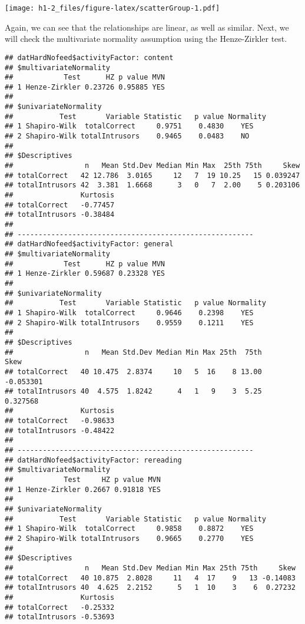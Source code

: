 \documentclass[12pt,]{article}
\newenvironment{Shaded}{\begin{snugshade}}{\end{snugshade}}
\newcommand{\DataTypeTok}[1]{\textcolor[rgb]{0.13,0.29,0.53}{#1}}
\newcommand{\KeywordTok}[1]{\textcolor[rgb]{0.13,0.29,0.53}{\textbf{#1}}}
\newcommand{\NormalTok}[1]{#1}
\newcommand{\OperatorTok}[1]{\textcolor[rgb]{0.81,0.36,0.00}{\textbf{#1}}}
\newcommand{\StringTok}[1]{\textcolor[rgb]{0.31,0.60,0.02}{#1}}
\begin{document}
\texttt{[image: h1-2\_files/figure-latex/scatterGroup-1.pdf]}

Again, we can see that the relationships are linear, as well as similar.
Next, we will check the multivariate normality assumption using the
Henze-Zirkler test.

\begin{Shaded}
\end{Shaded}

\begin{verbatim}
## datHardNofeed$activityFactor: content
## $multivariateNormality
##            Test      HZ p value MVN
## 1 Henze-Zirkler 0.23726 0.95885 YES
## 
## $univariateNormality
##           Test       Variable Statistic   p value Normality
## 1 Shapiro-Wilk  totalCorrect     0.9751    0.4830    YES   
## 2 Shapiro-Wilk totalIntrusors    0.9465    0.0483    NO    
## 
## $Descriptives
##                 n   Mean Std.Dev Median Min Max  25th 75th     Skew
## totalCorrect   42 12.786  3.0165     12   7  19 10.25   15 0.039247
## totalIntrusors 42  3.381  1.6668      3   0   7  2.00    5 0.203106
##                Kurtosis
## totalCorrect   -0.77457
## totalIntrusors -0.38484
## 
## -------------------------------------------------------- 
## datHardNofeed$activityFactor: general
## $multivariateNormality
##            Test      HZ p value MVN
## 1 Henze-Zirkler 0.59687 0.23328 YES
## 
## $univariateNormality
##           Test       Variable Statistic   p value Normality
## 1 Shapiro-Wilk  totalCorrect     0.9646    0.2398    YES   
## 2 Shapiro-Wilk totalIntrusors    0.9559    0.1211    YES   
## 
## $Descriptives
##                 n   Mean Std.Dev Median Min Max 25th  75th      Skew
## totalCorrect   40 10.475  2.8374     10   5  16    8 13.00 -0.053301
## totalIntrusors 40  4.575  1.8242      4   1   9    3  5.25  0.327568
##                Kurtosis
## totalCorrect   -0.98633
## totalIntrusors -0.48422
## 
## -------------------------------------------------------- 
## datHardNofeed$activityFactor: rereading
## $multivariateNormality
##            Test     HZ p value MVN
## 1 Henze-Zirkler 0.2667 0.91818 YES
## 
## $univariateNormality
##           Test       Variable Statistic   p value Normality
## 1 Shapiro-Wilk  totalCorrect     0.9858    0.8872    YES   
## 2 Shapiro-Wilk totalIntrusors    0.9665    0.2770    YES   
## 
## $Descriptives
##                 n   Mean Std.Dev Median Min Max 25th 75th     Skew
## totalCorrect   40 10.875  2.8028     11   4  17    9   13 -0.14083
## totalIntrusors 40  4.625  2.2152      5   1  10    3    6  0.27232
##                Kurtosis
## totalCorrect   -0.25332
## totalIntrusors -0.53693
\end{verbatim}
\end{document}

